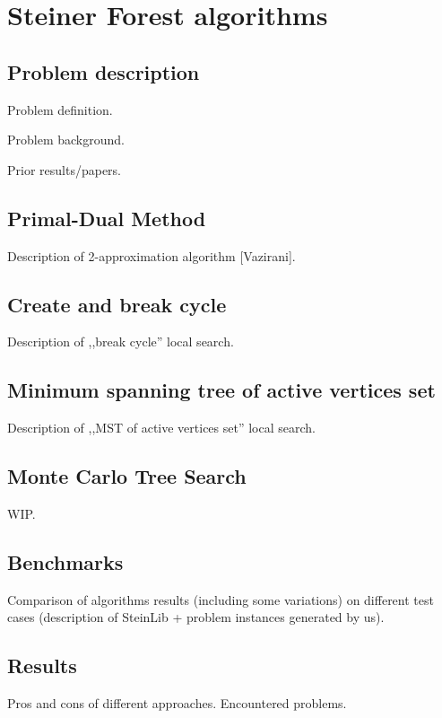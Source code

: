 \chapter{Steiner Forest algorithms}

\section{Problem description}
Problem definition.


Problem background.


Prior results/papers.

\section{Primal-Dual Method}
Description of 2-approximation algorithm [Vazirani].

\section{Create and break cycle}
Description of ,,break cycle'' local search.

\section{Minimum spanning tree of active vertices set}
Description of ,,MST of active vertices set'' local search.

\section{Monte Carlo Tree Search}
WIP.

\section{Benchmarks}
Comparison of algorithms results (including some variations) on different test cases (description of SteinLib + problem instances generated by us).

\section{Results}
Pros and cons of different approaches. Encountered problems.
